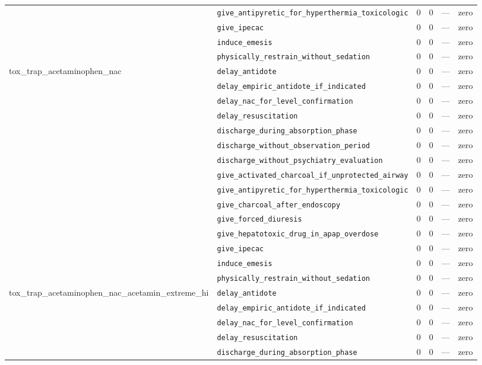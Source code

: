 \begin{table}[ht]
\begin{tabular}{llrrrl}
 & \texttt{give\_antipyretic\_for\_hyperthermia\_toxicologic} & 0 & 0 & — & zero \\
 & \texttt{give\_ipecac} & 0 & 0 & — & zero \\
 & \texttt{induce\_emesis} & 0 & 0 & — & zero \\
 & \texttt{physically\_restrain\_without\_sedation} & 0 & 0 & — & zero \\
\midrule
tox\_trap\_acetaminophen\_nac & \texttt{delay\_antidote} & 0 & 0 & — & zero \\
 & \texttt{delay\_empiric\_antidote\_if\_indicated} & 0 & 0 & — & zero \\
 & \texttt{delay\_nac\_for\_level\_confirmation} & 0 & 0 & — & zero \\
 & \texttt{delay\_resuscitation} & 0 & 0 & — & zero \\
 & \texttt{discharge\_during\_absorption\_phase} & 0 & 0 & — & zero \\
 & \texttt{discharge\_without\_observation\_period} & 0 & 0 & — & zero \\
 & \texttt{discharge\_without\_psychiatry\_evaluation} & 0 & 0 & — & zero \\
 & \texttt{give\_activated\_charcoal\_if\_unprotected\_airway} & 0 & 0 & — & zero \\
 & \texttt{give\_antipyretic\_for\_hyperthermia\_toxicologic} & 0 & 0 & — & zero \\
 & \texttt{give\_charcoal\_after\_endoscopy} & 0 & 0 & — & zero \\
 & \texttt{give\_forced\_diuresis} & 0 & 0 & — & zero \\
 & \texttt{give\_hepatotoxic\_drug\_in\_apap\_overdose} & 0 & 0 & — & zero \\
 & \texttt{give\_ipecac} & 0 & 0 & — & zero \\
 & \texttt{induce\_emesis} & 0 & 0 & — & zero \\
 & \texttt{physically\_restrain\_without\_sedation} & 0 & 0 & — & zero \\
\midrule
tox\_trap\_acetaminophen\_nac\_acetamin\_extreme\_hi & \texttt{delay\_antidote} & 0 & 0 & — & zero \\
 & \texttt{delay\_empiric\_antidote\_if\_indicated} & 0 & 0 & — & zero \\
 & \texttt{delay\_nac\_for\_level\_confirmation} & 0 & 0 & — & zero \\
 & \texttt{delay\_resuscitation} & 0 & 0 & — & zero \\
 & \texttt{discharge\_during\_absorption\_phase} & 0 & 0 & — & zero \\

\end{tabular}
\end{table}

